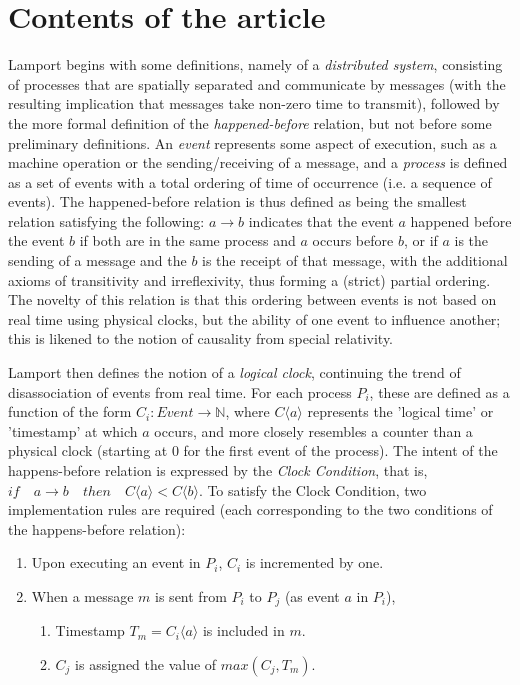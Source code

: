 \documentclass[11pt]{article}
\begin{document}
\section{Contents of the article}

Lamport begins with some definitions, namely of a \textit{distributed system},
consisting of processes that are spatially separated and communicate by messages 
(with the resulting implication that messages take non-zero time to transmit),
followed by the more formal definition of the \textit{happened-before} relation,
but not before some preliminary definitions. An \textit{event} represents some
aspect of execution, such as a machine operation or the sending/receiving of a
message, and a \textit{process} is defined as a set of events with a total
ordering of time of occurrence (i.e. a sequence of events). The happened-before
relation is thus defined as being the smallest relation satisfying the
following: \( a \rightarrow b \) indicates that the event \( a \) happened
before the event \( b \) if both are in the same process and \(a\) occurs
before \(b\), or if \(a\) is the sending of a message and the \(b\)
is the receipt of that message, with the additional axioms of transitivity and
irreflexivity, thus forming a (strict) partial ordering. The novelty of this
relation is that this ordering between events is not based on real time using
physical clocks, but the ability of one event to influence another; this is
likened to the notion of causality from special relativity.  
\par
Lamport then defines the notion of a \textit{logical clock}, continuing the
trend of disassociation of events from real time. For each process \( P_i \),
these are defined as a function of the form \( C_i : Event \rightarrow
\mathbb{N} \), where \( C \langle a \rangle \) represents the 'logical
time' or 'timestamp' at which \( a \) occurs, and more closely resembles a
counter than a physical clock (starting at 0 for the first event of the
process). The intent of the happens-before relation is expressed by the
\textit{Clock Condition}, that is, 
\(
    if \quad a \rightarrow b \quad 
    then \quad C \langle a \rangle < C \langle b \rangle
\).
To satisfy the Clock Condition, two implementation rules are required
(each corresponding to the two conditions of the happens-before relation):
\begin{enumerate}
    \item Upon executing an event in \( P_i \), \( C_i \) is incremented by one.
    \item When a message \( m \) is sent from \( P_i \) to \( P_j \) (as event
        \(a\) in \(P_i\)),
        \begin{enumerate}
            \item Timestamp \( T_m = C_i \langle a \rangle \) is included in 
                \( m \).
            \item \( C_j \) is assigned the value of \( max(C_j, T_m) \).
        \end{enumerate}
\end{enumerate}
\end{document}

